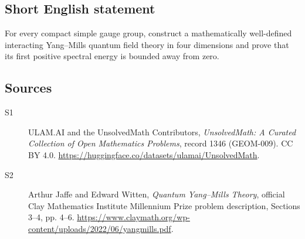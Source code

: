 \documentclass[11pt]{article}
\begin{document}
\subsection{Short English statement}
For every compact simple gauge group, construct a mathematically well-defined interacting Yang--Mills quantum field theory in four dimensions and prove that its first positive spectral energy is bounded away from zero.
\subsection{Sources}
\begin{description}
\item[\hypertarget{source:1346:1}{S1}] ULAM.AI and the UnsolvedMath Contributors, \emph{UnsolvedMath: A Curated Collection of Open Mathematics Problems}, record 1346 (GEOM-009). CC BY 4.0. \url{https://huggingface.co/datasets/ulamai/UnsolvedMath}.
\item[\hypertarget{source:1346:2}{S2}] Arthur Jaffe and Edward Witten, \emph{Quantum Yang--Mills Theory}, official Clay Mathematics Institute Millennium Prize problem description, Sections 3--4, pp. 4--6. \url{https://www.claymath.org/wp-content/uploads/2022/06/yangmills.pdf}.
\end{description}
\label{end:1346}
\end{document}
